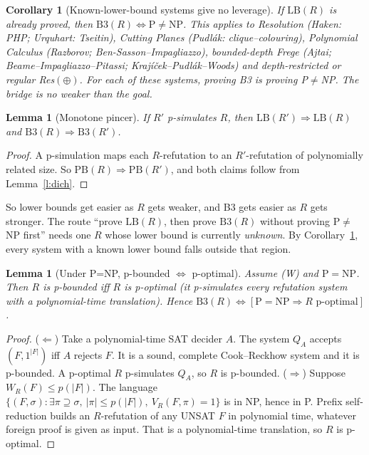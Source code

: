 \documentclass[11pt]{article}
\newtheorem{lemma}[theorem]{Lemma}
\newtheorem{corollary}[theorem]{Corollary}
\theoremstyle{definition}
\begin{document}
\begin{corollary}[Known-lower-bound systems give no leverage]\label{c:known}
If $\mathrm{LB}(R)$ is already proved, then $\mathrm{B3}(R)\iff\mathrm P\ne\mathrm{NP}$.
This applies to Resolution (Haken: PHP; Urquhart: Tseitin), Cutting Planes
(Pudlák: clique--colouring), Polynomial Calculus (Razborov; Ben-Sasson--Impagliazzo),
bounded-depth Frege (Ajtai; Beame--Impagliazzo--Pitassi; Krajíček--Pudlák--Woods)
and depth-restricted or regular Res$(\oplus)$.
For each of these systems, proving B3 \emph{is} proving P$\ne$NP. The bridge is no
weaker than the goal.
\end{corollary}

\begin{lemma}[Monotone pincer]\label{l:mono}
If $R'$ p-simulates $R$, then $\mathrm{LB}(R')\Rightarrow\mathrm{LB}(R)$ and
$\mathrm{B3}(R)\Rightarrow\mathrm{B3}(R')$.
\end{lemma}
\begin{proof}
A p-simulation maps each $R$-refutation to an $R'$-refutation of polynomially
related size. So $\mathrm{PB}(R)\Rightarrow\mathrm{PB}(R')$, and both claims
follow from Lemma~\ref{l:dich}.
\end{proof}
So lower bounds get easier as $R$ gets weaker, and B3 gets easier as $R$ gets
stronger. The route ``prove $\mathrm{LB}(R)$, then prove $\mathrm{B3}(R)$
without proving P$\ne$NP first'' needs one $R$ whose lower bound is currently
\emph{unknown}. By Corollary~\ref{c:known}, every system with a known lower bound
falls outside that region.

\begin{lemma}[Under P=NP, p-bounded $\iff$ p-optimal]\label{l:opt}
Assume (W) and $\mathrm P=\mathrm{NP}$. Then $R$ is p-bounded iff $R$ is
p-optimal (it p-simulates every refutation system with a polynomial-time
translation). Hence $\mathrm{B3}(R)\iff[\mathrm P=\mathrm{NP}\Rightarrow R\text{ p-optimal}]$.
\end{lemma}
\begin{proof}
($\Leftarrow$) Take a polynomial-time SAT decider $A$. The system $Q_A$ accepts
$(F,1^{|F|})$ iff $A$ rejects $F$. It is a sound, complete Cook--Reckhow system
and it is p-bounded. A p-optimal $R$ p-simulates $Q_A$, so $R$ is p-bounded.
($\Rightarrow$) Suppose $W_R(F)\le p(|F|)$. The language
$\{(F,\sigma):\exists\pi\supseteq\sigma,\ |\pi|\le p(|F|),\ V_R(F,\pi)=1\}$ is
in NP, hence in P. Prefix self-reduction builds an $R$-refutation of any UNSAT
$F$ in polynomial time, whatever foreign proof is given as input. That is a
polynomial-time translation, so $R$ is p-optimal.
\end{proof}
\end{document}
